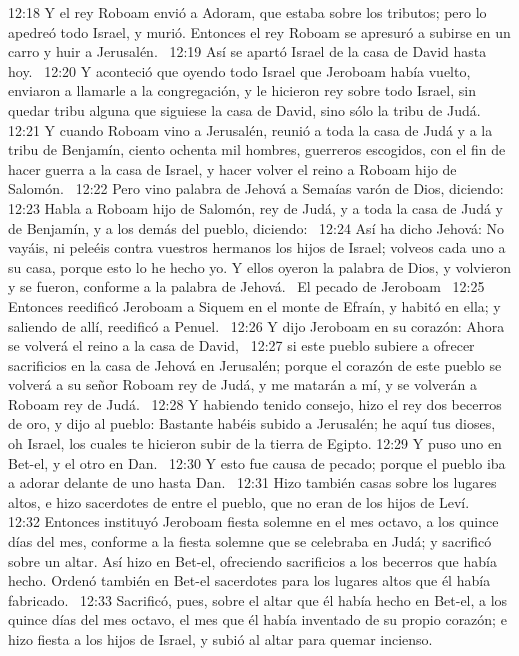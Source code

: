 12:18 Y el rey Roboam envió a Adoram, que estaba sobre los tributos; pero lo apedreó todo Israel, y murió. Entonces el rey Roboam se apresuró a subirse en un carro y huir a Jerusalén.  
12:19 Así se apartó Israel de la casa de David hasta hoy.  
12:20 Y aconteció que oyendo todo Israel que Jeroboam había vuelto, enviaron a llamarle a la congregación, y le hicieron rey sobre todo Israel, sin quedar tribu alguna que siguiese la casa de David, sino sólo la tribu de Judá.  
12:21 Y cuando Roboam vino a Jerusalén, reunió a toda la casa de Judá y a la tribu de Benjamín, ciento ochenta mil hombres, guerreros escogidos, con el fin de hacer guerra a la casa de Israel, y hacer volver el reino a Roboam hijo de Salomón.  
12:22 Pero vino palabra de Jehová a Semaías varón de Dios, diciendo:  
12:23 Habla a Roboam hijo de Salomón, rey de Judá, y a toda la casa de Judá y de Benjamín, y a los demás del pueblo, diciendo:  
12:24 Así ha dicho Jehová: No vayáis, ni peleéis contra vuestros hermanos los hijos de Israel; volveos cada uno a su casa, porque esto lo he hecho yo. Y ellos oyeron la palabra de Dios, y volvieron y se fueron, conforme a la palabra de Jehová.  
El pecado de Jeroboam  
12:25 Entonces reedificó Jeroboam a Siquem en el monte de Efraín, y habitó en ella; y saliendo de allí, reedificó a Penuel.  
12:26 Y dijo Jeroboam en su corazón: Ahora se volverá el reino a la casa de David,  
12:27 si este pueblo subiere a ofrecer sacrificios en la casa de Jehová en Jerusalén; porque el corazón de este pueblo se volverá a su señor Roboam rey de Judá, y me matarán a mí, y se volverán a Roboam rey de Judá.  
12:28 Y habiendo tenido consejo, hizo el rey dos becerros de oro, y dijo al pueblo: Bastante habéis subido a Jerusalén; he aquí tus dioses, oh Israel, los cuales te hicieron subir de la tierra de Egipto. 
12:29 Y puso uno en Bet-el, y el otro en Dan.  
12:30 Y esto fue causa de pecado; porque el pueblo iba a adorar delante de uno hasta Dan.  
12:31 Hizo también casas sobre los lugares altos, e hizo sacerdotes de entre el pueblo, que no eran de los hijos de Leví.  
12:32 Entonces instituyó Jeroboam fiesta solemne en el mes octavo, a los quince días del mes, conforme a la fiesta solemne que se celebraba en Judá; y sacrificó sobre un altar. Así hizo en Bet-el, ofreciendo sacrificios a los becerros que había hecho. Ordenó también en Bet-el sacerdotes para los lugares altos que él había fabricado.  
12:33 Sacrificó, pues, sobre el altar que él había hecho en Bet-el, a los quince días del mes octavo, el mes que él había inventado de su propio corazón; e hizo fiesta a los hijos de Israel, y subió al altar para quemar incienso.  
